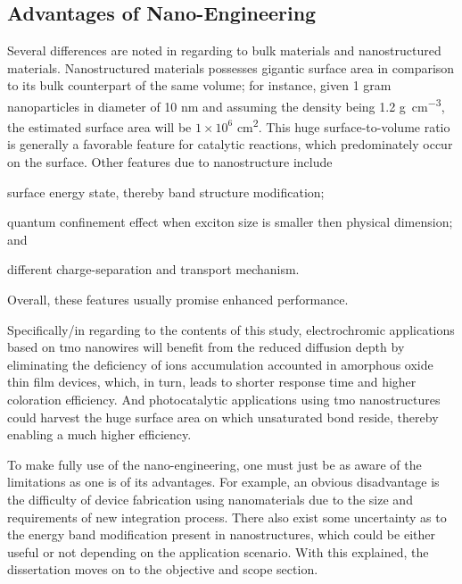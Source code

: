 \subsection{Advantages of Nano-Engineering}\label{sec:nanoadv}

Several differences are noted in regarding to bulk materials and nanostructured materials. Nanostructured materials possesses gigantic surface area in comparison to its bulk counterpart of the same volume; for instance, given 1 gram  nanoparticles in diameter of 10 nm and assuming the density being 1.2 \si{g\per cm^3}, the estimated surface area will be $1\times10^6$ \si{cm^2}. This huge surface-to-volume ratio is generally a favorable feature for catalytic reactions, which predominately occur on the surface.\cite{Sha2009} Other features due to nanostructure include 
\begin{enumerate*}[label=\itshape\alph*\upshape)]
\item surface energy state, thereby band structure modification;
\item quantum confinement effect when exciton size is smaller then physical dimension; and
\item different charge-separation and transport mechanism.
\end{enumerate*} Overall, these features usually promise enhanced performance. 

Specifically/in regarding to the contents of this study, electrochromic applications based on \gls{tmo} nanowires will benefit from the reduced diffusion depth by eliminating the deficiency of ions accumulation accounted in amorphous oxide thin film devices, which, in turn, leads to shorter response time and higher coloration efficiency.\cite{Huang2008a,Scherer2012} And photocatalytic applications using \gls{tmo} nanostructures could harvest the huge surface area on which unsaturated bond reside, thereby enabling a much higher efficiency.\cite{Mills1993,Merki2011,Chen2011b}

To make fully use of the nano-engineering, one must just be as aware of the limitations as one is of its advantages. For example, an obvious disadvantage is the difficulty of device fabrication using nanomaterials due to the size and requirements of new integration process. There also exist some uncertainty as to the energy band modification present in nanostructures, which could be either useful or not depending on the application scenario.\cite{Wang2012} With this explained, the dissertation moves on to the objective and scope section. 

